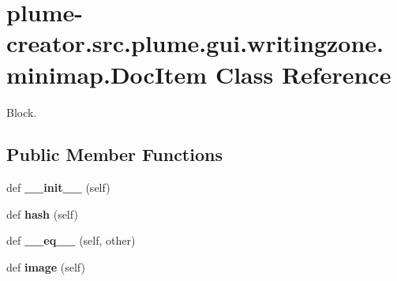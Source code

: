 \hypertarget{classplume-creator_1_1src_1_1plume_1_1gui_1_1writingzone_1_1minimap_1_1_doc_item}{}\section{plume-\/creator.src.\+plume.\+gui.\+writingzone.\+minimap.\+Doc\+Item Class Reference}
\label{classplume-creator_1_1src_1_1plume_1_1gui_1_1writingzone_1_1minimap_1_1_doc_item}


Block.  


\subsection*{Public Member Functions}
\begin{DoxyCompactItemize}
\item 
def {\bfseries \+\_\+\+\_\+init\+\_\+\+\_\+} (self)\hypertarget{classplume-creator_1_1src_1_1plume_1_1gui_1_1writingzone_1_1minimap_1_1_doc_item_ab324b55665a7e20e759c58d543f7d26f}{}\label{classplume-creator_1_1src_1_1plume_1_1gui_1_1writingzone_1_1minimap_1_1_doc_item_ab324b55665a7e20e759c58d543f7d26f}

\item 
def {\bfseries hash} (self)\hypertarget{classplume-creator_1_1src_1_1plume_1_1gui_1_1writingzone_1_1minimap_1_1_doc_item_aa5786765f8d41349c583c50778f9a0e1}{}\label{classplume-creator_1_1src_1_1plume_1_1gui_1_1writingzone_1_1minimap_1_1_doc_item_aa5786765f8d41349c583c50778f9a0e1}

\item 
def {\bfseries \+\_\+\+\_\+eq\+\_\+\+\_\+} (self, other)\hypertarget{classplume-creator_1_1src_1_1plume_1_1gui_1_1writingzone_1_1minimap_1_1_doc_item_ae9f2dcbf1594eb1890100ccc56a016b8}{}\label{classplume-creator_1_1src_1_1plume_1_1gui_1_1writingzone_1_1minimap_1_1_doc_item_ae9f2dcbf1594eb1890100ccc56a016b8}

\item 
def {\bfseries image} (self)\hypertarget{classplume-creator_1_1src_1_1plume_1_1gui_1_1writingzone_1_1minimap_1_1_doc_item_ab5a611a91d54aff408c7faf4d01120d1}{}\label{classplume-creator_1_1src_1_1plume_1_1gui_1_1writingzone_1_1minimap_1_1_doc_item_ab5a611a91d54aff408c7faf4d01120d1}

\end{DoxyCompactItemize}
